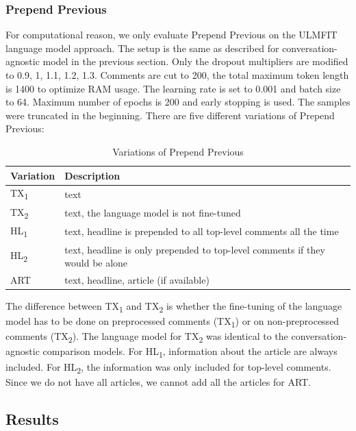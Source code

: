 \subsubsection{Prepend Previous}

For computational reason, we only evaluate Prepend Previous on the ULMFIT language model approach. The setup is the same as described for conversation-agnostic model in the previous section. Only the dropout multipliers are modified to 0.9, 1, 1.1, 1.2, 1.3. Comments are cut to 200, the total maximum token length is 1400 to optimize RAM usage. The learning rate is set to 0.001 and batch size to 64. Maximum number of epochs is 200 and early stopping is used.
The samples were truncated in the beginning. There are five different variations of Prepend Previous:

\begin{table}[H]
\caption{Variations of Prepend Previous}
\label{tab:eval_ynacc_setup}
\begin{tabular}{l l}
\toprule
Variation & Description \\
\midrule
TX\textsubscript{1} & text \\
TX\textsubscript{2} & text, the language model is not fine-tuned  \\
 HL\textsubscript{1} & text, headline is prepended to all top-level comments all the time \\
 HL\textsubscript{2} & text, headline is only prepended to top-level comments if they would be alone \\
 ART & text, headline, article (if available) \\
\bottomrule
\end{tabular}	
\end{table}

The difference between TX\textsubscript{1} and TX\textsubscript{2} is whether the fine-tuning of the language model has to be done on preprocessed comments (TX\textsubscript{1}) or on non-preprocessed comments (TX\textsubscript{2}). The language model for TX\textsubscript{2} was identical to the conversation-agnostic comparison models. For HL\textsubscript{1}, information about the article are always included. For HL\textsubscript{2}, the information was only included for top-level comments.
Since we do not have all articles, we cannot add all the articles for ART.

\subsection{Results}
\label{sec:exp_ynacc_results}

